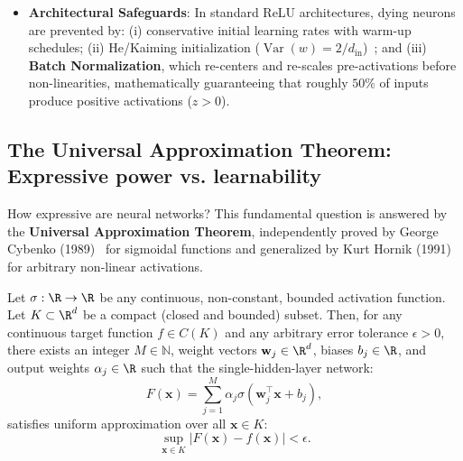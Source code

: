 \begin{itemize}[leftmargin=*]
\begin{equation}
  \end{equation}
  ELU provides $C^1$ smoothness at $z = 0$ (when $\alpha = 1$) and drives mean activations closer to zero, accelerating convergence.
  \item \textbf{Architectural Safeguards}: In standard ReLU architectures, dying neurons are prevented by: (i) conservative initial learning rates with warm-up schedules; (ii) He/Kaiming initialization ($\operatorname{Var}(w) = 2/d_{\text{in}}$)~\cite{he2015delving}; and (iii) \textbf{Batch Normalization}, which re-centers and re-scales pre-activations before non-linearities, mathematically guaranteeing that roughly $50\%$ of inputs produce positive activations ($z > 0$).
\end{itemize}

\subsection{The Universal Approximation Theorem: Expressive power vs. learnability}
\label{sec:universal_approximation_theorem}

How expressive are neural networks? This fundamental question is answered by the \textbf{Universal Approximation Theorem}, independently proved by George Cybenko (1989)~\cite{cybenko1989approximation} for sigmoidal functions and generalized by Kurt Hornik (1991)~\cite{hornik1991approximation} for arbitrary non-linear activations.

\begin{theorem}
Let $\sigma: \R \to \R$ be any continuous, non-constant, bounded activation function. Let $K \subset \R^d$ be a compact (closed and bounded) subset. Then, for any continuous target function $f \in C(K)$ and any arbitrary error tolerance $\epsilon > 0$, there exists an integer $M \in \mathbb{N}$, weight vectors $\mathbf{w}_j \in \R^d$, biases $b_j \in \R$, and output weights $\alpha_j \in \R$ such that the single-hidden-layer network:
\begin{equation}
F(\mathbf{x}) = \sum_{j=1}^M \alpha_j \sigma(\mathbf{w}_j^\top \mathbf{x} + b_j),
\label{eq:universal_approximator_form}
\end{equation}
satisfies uniform approximation over all $\mathbf{x} \in K$:
\begin{equation}
\sup_{\mathbf{x} \in K} |F(\mathbf{x}) - f(\mathbf{x})| < \epsilon.
\label{eq:universal_approximation_bound}
\end{equation}
\end{theorem}

